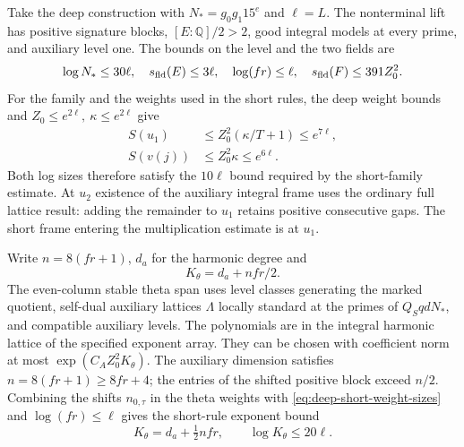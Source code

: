 \begin{established}\label{hyp:deep-short-span}
Take the deep construction with \(N_*=g_0g_1 15^e\) and
\(\ell=L\). The nonterminal lift has positive signature blocks, \([E:\mathbb Q]/2>2\),
good integral models at every prime, and auxiliary level one.
The bounds on the level and the two fields are
\[
 \log N_*\le30\ell,\quad s_{\rm fld}(E)\le3\ell,\quad
 \log(fr)\le\ell,\quad s_{\rm fld}(F)\le391 Z_0^2 .
\]
For the family and the weights used in the short rules, the deep
weight bounds and \(Z_0\le e^{2\ell},\ \kappa\le e^{2\ell}\) give
\begin{equation}\label{eq:deep-short-weight-sizes}
 \begin{aligned}
 S(u_1)&\le Z_0^2(\kappa/T+1)\le e^{7\ell},\\
 S(v(j))&\le Z_0^2\kappa\le e^{6\ell}.
 \end{aligned}
\end{equation}
Both log sizes therefore satisfy the \(10\ell\) bound required by
the short-family estimate.
At \(u_2\) existence
of the auxiliary integral frame uses the ordinary full
lattice result: adding the remainder to \(u_1\) retains
positive consecutive gaps. The short frame entering the
multiplication estimate is at \(u_1\).

Write \(n=8(fr+1)\), \(d_a\) for the harmonic degree and
\[
 K_\theta=d_a+nfr/2.
\]
The even-column stable theta span
uses level classes generating the marked quotient, self-dual
auxiliary lattices \(\Lambda\) locally standard at the primes
of \(Q_S qd N_*\), and compatible auxiliary levels.
The polynomials are in the integral harmonic lattice of
the specified exponent array. They can be chosen with coefficient norm at most \(\exp(C_A Z_0^2 K_\theta)\). The auxiliary dimension satisfies \(n=8(fr+1)\ge8fr+4\);
the entries of the shifted positive block exceed \(n/2\).
Combining the shifts \(n_{0,\tau}\) in the theta weights with \eqref{eq:deep-short-weight-sizes}
and \(\log(fr)\le\ell\) gives the short-rule exponent bound
\[
 K_\theta=d_a+\tfrac12 nfr,\qquad \log K_\theta\le20\ell .
\]
\label{cor:deep-short-readings-1}
\end{established}

